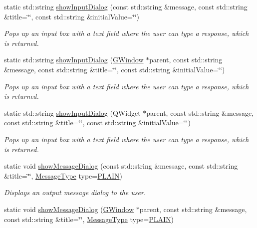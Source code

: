 \begin{DoxyCompactItemize}
static std\+::string \mbox{\hyperlink{classGOptionPane_a50fdc381453e6b8c495e3f9fe07b7bec}{show\+Input\+Dialog}} (const std\+::string \&message, const std\+::string \&title=\char`\"{}\char`\"{}, const std\+::string \&initial\+Value=\char`\"{}\char`\"{})
\begin{DoxyCompactList}\small\item\em Pops up an input box with a text field where the user can type a response, which is returned. \end{DoxyCompactList}\item 
static std\+::string \mbox{\hyperlink{classGOptionPane_a035a6d874c9e81773e7c61305dbecabb}{show\+Input\+Dialog}} (\mbox{\hyperlink{classGWindow}{G\+Window}} $\ast$parent, const std\+::string \&message, const std\+::string \&title=\char`\"{}\char`\"{}, const std\+::string \&initial\+Value=\char`\"{}\char`\"{})
\begin{DoxyCompactList}\small\item\em Pops up an input box with a text field where the user can type a response, which is returned. \end{DoxyCompactList}\item 
static std\+::string \mbox{\hyperlink{classGOptionPane_aabd3a04a3cdc998ee0e7e7e31676df17}{show\+Input\+Dialog}} (Q\+Widget $\ast$parent, const std\+::string \&message, const std\+::string \&title=\char`\"{}\char`\"{}, const std\+::string \&initial\+Value=\char`\"{}\char`\"{})
\begin{DoxyCompactList}\small\item\em Pops up an input box with a text field where the user can type a response, which is returned. \end{DoxyCompactList}\item 
static void \mbox{\hyperlink{classGOptionPane_ac72936da553721b532ea51a831a2993a}{show\+Message\+Dialog}} (const std\+::string \&message, const std\+::string \&title=\char`\"{}\char`\"{}, \mbox{\hyperlink{classGOptionPane_ac6606ebe91c8ac66a2c314c79f5ab013}{Message\+Type}} type=\mbox{\hyperlink{classGOptionPane_ac6606ebe91c8ac66a2c314c79f5ab013a8386f3e3e7be0b7b603636867c133a5d}{P\+L\+A\+IN}})
\begin{DoxyCompactList}\small\item\em Displays an output message dialog to the user. \end{DoxyCompactList}\item 
static void \mbox{\hyperlink{classGOptionPane_a72a54f763487c83c587a79611e8ae685}{show\+Message\+Dialog}} (\mbox{\hyperlink{classGWindow}{G\+Window}} $\ast$parent, const std\+::string \&message, const std\+::string \&title=\char`\"{}\char`\"{}, \mbox{\hyperlink{classGOptionPane_ac6606ebe91c8ac66a2c314c79f5ab013}{Message\+Type}} type=\mbox{\hyperlink{classGOptionPane_ac6606ebe91c8ac66a2c314c79f5ab013a8386f3e3e7be0b7b603636867c133a5d}{P\+L\+A\+IN}})

\end{DoxyCompactItemize}
